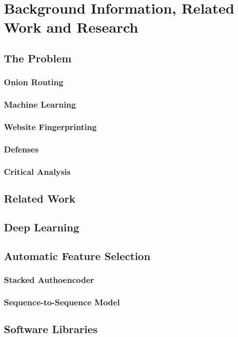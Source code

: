 \section{Background Information, Related Work and Research}

\subsection{The Problem}
\subsubsection{Onion Routing}

\subsubsection{Machine Learning}

\subsubsection{Website Fingerprinting}

\subsubsection{Defenses}

\subsubsection{Critical Analysis}

\subsection{Related Work}

\subsection{Deep Learning}

\subsection{Automatic Feature Selection}

\subsubsection{Stacked Authoencoder}

\subsubsection{Sequence-to-Sequence Model}

\subsection{Software Libraries}
